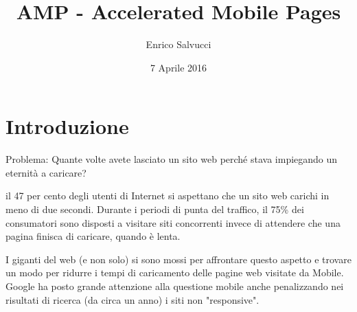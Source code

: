 \documentclass[a4paper]{article}
\title{AMP - Accelerated Mobile Pages}
\author{Enrico Salvucci}
\date{7 Aprile 2016}
\begin{document}
\maketitle

\newpage

\tableofcontents

\newpage
\section{Introduzione}

Problema: Quante volte avete lasciato un sito web perché stava impiegando un eternità a caricare?

il 47 per cento degli utenti di Internet si aspettano che un sito web carichi in meno di due secondi.
Durante i periodi di punta del traffico, il 75\% dei consumatori sono disposti a visitare siti concorrenti invece di attendere che una pagina finisca di caricare, quando è lenta.

I giganti del web (e non solo) si sono mossi per affrontare questo aspetto e trovare un modo per ridurre i tempi di caricamento delle pagine web visitate da Mobile.
Google ha posto grande attenzione alla questione mobile anche penalizzando nei risultati di ricerca (da circa un anno) i siti non "responsive".
\end{document}
